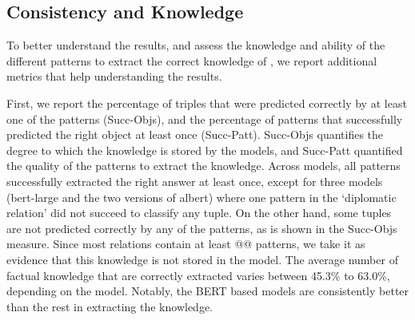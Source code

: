 % 


\subsection{Consistency and Knowledge}

To better understand the results, and assess the knowledge and ability of the different patterns to extract the correct knowledge of \resource{}, we report additional metrics that help understanding the results. 

First, we report the percentage of triples that were predicted correctly by at least one of the patterns (Succ-Objs), and the percentage of patterns that successfully predicted the right object at least once (Succ-Patt). Succ-Objs quantifies the degree to which the knowledge is stored by the models, and Succ-Patt quantified the quality of the patterns to extract the knowledge.
Across models, all patterns successfully extracted the right
answer at least once, except for three models (bert-large and the two versions of albert) where one pattern in the `diplomatic relation'  did not succeed to classify any tuple.
On the other hand, some tuples are not predicted correctly by any of the patterns, as is shown in the Succ-Objs measure. Since most relations contain at least @@ patterns, we take it as evidence that this knowledge is not stored in the model. 
The average number of factual knowledge that are correctly extracted varies between 45.3\% to 63.0\%, depending on the model. Notably, the BERT based models are consistently better than the rest in extracting the knowledge. 

